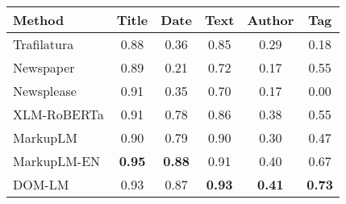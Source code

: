 \renewcommand{\arraystretch}{1.15}

\begin{tabular}{|l|ccccc|}
\hline
Method & Title & Date & Text & Author & Tag \\ 
\hline
Trafilatura & 0.88 & 0.36 & 0.85 & 0.29 & 0.18 \\
Newspaper & 0.89 & 0.21 & 0.72 & 0.17 & 0.55 \\
Newsplease & 0.91 & 0.35 & 0.70 & 0.17 & 0.00 \\
\hline
XLM-RoBERTa & 0.91 & 0.78 & 0.86 & 0.38 & 0.55 \\
MarkupLM & 0.90 & 0.79 & 0.90 & 0.30 & 0.47 \\
MarkupLM-EN & \textbf{0.95} & \textbf{0.88} & 0.91 & 0.40 & 0.67 \\
DOM-LM & 0.93 & 0.87 & \textbf{0.93} & \textbf{0.41} & \textbf{0.73} \\
\hline
\end{tabular}